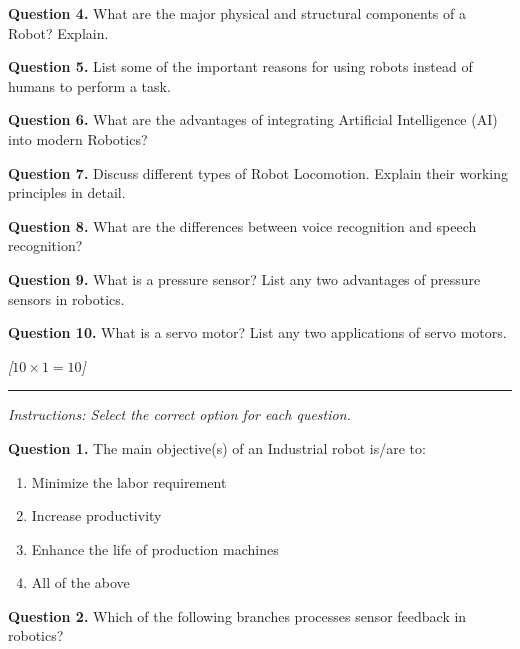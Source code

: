 \documentclass[11pt,a4paper]{article}
\newcommand{\pts}[1]{\hfill   \textit{[#1]}}
\begin{document}
\medskip


\noindent   \textbf{Question 4.} What are the major physical and structural components of a Robot? Explain.

\medskip


\noindent   \textbf{Question 5.} List some of the important reasons for using robots instead of humans to perform a task.

\medskip


\noindent   \textbf{Question 6.} What are the advantages of integrating Artificial Intelligence (AI) into modern Robotics?

\medskip


\noindent   \textbf{Question 7.} Discuss different types of Robot Locomotion. Explain their working principles in detail.

\medskip


\noindent   \textbf{Question 8.} What are the differences between voice recognition and speech recognition?

\medskip


\noindent   \textbf{Question 9.} What is a pressure sensor? List any two advantages of pressure sensors in robotics.

\medskip


\noindent   \textbf{Question 10.} What is a servo motor? List any two applications of servo motors.

\bigskip


\pts{$10  \times 1 = 10$}
\rule{\linewidth}{0.4pt}\smallskip




\noindent   \textit{Instructions: Select the correct option for each question.}

\medskip


\noindent   \textbf{Question 1.} The main objective(s) of an Industrial robot is/are to:

\begin{enumerate}[label=(\alph*),itemsep=2pt]
  \item Minimize the labor requirement
  \item Increase productivity
  \item Enhance the life of production machines
  \item All of the above
\end{enumerate}

\medskip


\noindent   \textbf{Question 2.} Which of the following branches processes sensor feedback in robotics?
\end{document}
